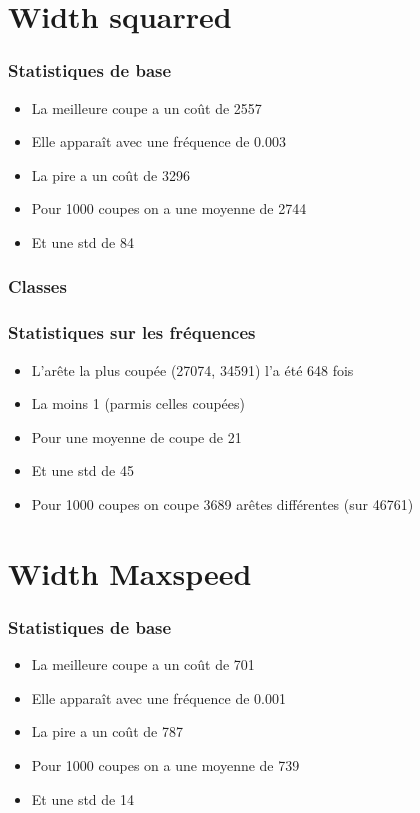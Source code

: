\documentclass[aspectratio=169]{beamer}
\begin{document}
    \section{Width squarred}

    \begin{frame}
        \frametitle{Statistiques de base}

        \begin{itemize}
            \item La meilleure coupe a un coût de 2557
            \item Elle apparaît avec une fréquence de 0.003
            \item La pire a un coût de 3296
            \item Pour 1000 coupes on a une moyenne de 2744
            \item Et une std de 84
        \end{itemize}
    
    \end{frame}

    \begin{frame}
        \frametitle{Classes}
    
        
    
    \end{frame}

    \begin{frame}
        \frametitle{Statistiques sur les fréquences}
        
        \begin{itemize}
            \item L'arête la plus coupée (27074, 34591) l'a été 648 fois
            \item La moins 1 (parmis celles coupées)
            \item Pour une moyenne de coupe de 21
            \item Et une std de 45
            \item Pour 1000 coupes on coupe 3689 arêtes différentes (sur 46761)
        \end{itemize}
    
    \end{frame}

    \section{Width Maxspeed}
    \begin{frame}
        \frametitle{Statistiques de base}
        
        \begin{itemize}
            \item La meilleure coupe a un coût de 701
            \item Elle apparaît avec une fréquence de 0.001
            \item La pire a un coût de 787
            \item Pour 1000 coupes on a une moyenne de 739
            \item Et une std de 14
        \end{itemize}
    
    \end{frame}
\end{document}
